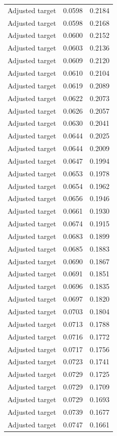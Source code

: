 \begin{table}[htbp]
\begin{tabular}{lll}
Adjusted target & 0.0598 & 0.2184 \\
Adjusted target & 0.0598 & 0.2168 \\
Adjusted target & 0.0600 & 0.2152 \\
Adjusted target & 0.0603 & 0.2136 \\
Adjusted target & 0.0609 & 0.2120 \\
Adjusted target & 0.0610 & 0.2104 \\
Adjusted target & 0.0619 & 0.2089 \\
Adjusted target & 0.0622 & 0.2073 \\
Adjusted target & 0.0626 & 0.2057 \\
Adjusted target & 0.0630 & 0.2041 \\
Adjusted target & 0.0644 & 0.2025 \\
Adjusted target & 0.0644 & 0.2009 \\
Adjusted target & 0.0647 & 0.1994 \\
Adjusted target & 0.0653 & 0.1978 \\
Adjusted target & 0.0654 & 0.1962 \\
Adjusted target & 0.0656 & 0.1946 \\
Adjusted target & 0.0661 & 0.1930 \\
Adjusted target & 0.0674 & 0.1915 \\
Adjusted target & 0.0683 & 0.1899 \\
Adjusted target & 0.0685 & 0.1883 \\
Adjusted target & 0.0690 & 0.1867 \\
Adjusted target & 0.0691 & 0.1851 \\
Adjusted target & 0.0696 & 0.1835 \\
Adjusted target & 0.0697 & 0.1820 \\
Adjusted target & 0.0703 & 0.1804 \\
Adjusted target & 0.0713 & 0.1788 \\
Adjusted target & 0.0716 & 0.1772 \\
Adjusted target & 0.0717 & 0.1756 \\
Adjusted target & 0.0723 & 0.1741 \\
Adjusted target & 0.0729 & 0.1725 \\
Adjusted target & 0.0729 & 0.1709 \\
Adjusted target & 0.0729 & 0.1693 \\
Adjusted target & 0.0739 & 0.1677 \\
Adjusted target & 0.0747 & 0.1661 \\

\end{tabular}
\end{table}
